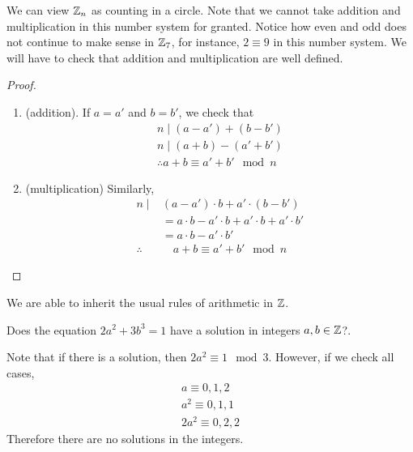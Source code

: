 \documentclass{article}
\begin{document}
We can view $\mathbb{Z}_n$ as counting in a circle.
Note that we cannot take addition and multiplication in this number system for granted. Notice how even and odd does not continue to make sense in $\mathbb{Z}_7$, for instance, $2 \equiv 9$ in  this number system. We will have to check that addition and multiplication are well defined.

\begin{proof}\leavevmode
    \begin{enumerate}
        \item (addition). If $a = a'$ and $b = b'$, we check that
        \begin{align*}
            n \mid (a - a') + (b - b') \\
            n \mid (a + b) - (a' + b') \\
            \therefore a + b \equiv a' + b' \mod n
        \end{align*}
        
        \item (multiplication) Similarly,
        \begin{align*}
            n \mid& (a - a')\cdot b + a' \cdot(b - b') \\
            &= a \cdot b - a' \cdot b + a' \cdot b + a' \cdot b' \\
            &= a \cdot b - a' \cdot b' \\
            \therefore& \quad a + b \equiv a' + b' \mod n
        \end{align*}
    \end{enumerate}
\end{proof}


We are able to inherit the usual rules of arithmetic in $\mathbb{Z}$.

\begin{eg}
    Does the equation $2a^2 + 3b^3 = 1$ have a solution in integers $a, b \in \mathbb{Z}$?. 

    Note that if there is a solution, then $2a^2 \equiv 1 \mod 3$. However, if we check all cases,
    \begin{align*}
        a \equiv 0, 1, 2 \\
        a^2 \equiv 0, 1, 1 \\
        2a^2 \equiv 0, 2, 2
    \end{align*}
    Therefore there are no solutions in the integers.
\end{eg}
\end{document}
